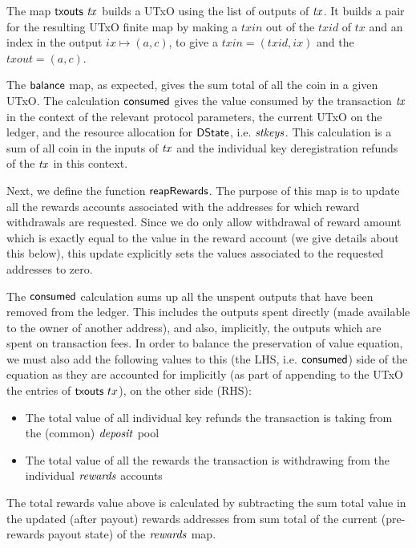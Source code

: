 \documentclass[11pt,a4paper,dvipsnames]{article}
\newcommand{\DState}{\type{DState}}
\theoremstyle{definition}
\theoremstyle{definition}
\begin{document}
The map $\mathsf{txouts}~ \mathit{tx}$ builds a UTxO using the
list of outputs of $\mathit{tx}$. It builds a pair for the resulting UTxO
finite map by making a $txin$ out of the $txid$ of $tx$ and an index in the output $ix \mapsto (a,c)$, to give a $txin = (txid, ix)$ and the
$txout=(a,c)$.

The $\mathsf{balance}$ map, as expected, gives the sum total of all the coin in
a given UTxO. The calculation $\mathsf{consumed}$ gives the value consumed
by the transaction $\mathit{tx}$ in the context of the relevant protocol
parameters, the current UTxO on the ledger, and the resource allocation for
$\DState$, i.e. $\mathit{stkeys}$. This calculation is a sum of all coin in the inputs of
$\mathit{tx}$  and the individual key
deregistration refunds of the $\mathit{tx}$ in this context.

Next, we define the function $\mathsf{reapRewards}$. The purpose of this map is
to update all the rewards accounts associated with the addresses for which
reward withdrawals are requested. Since we do only allow withdrawal of reward
amount which is exactly equal to the value in the reward account (we
give details about this below), this update explicitly sets the values
associated to the requested addresses to zero.

The $\mathsf{consumed}$ calculation sums up all the unspent outputs that
have been removed from the ledger. This includes the outputs spent directly
(made available to the owner of another address), and also, implicitly,
the outputs which are spent on transaction fees. In order to balance
the preservation of value equation, we must also add the following values
to this (the LHS, i.e. $\mathsf{consumed}$) side of the equation as they are
accounted for implicitly (as
part of appending to the UTxO the entries of $\mathsf{txouts}~{tx}$), on the
other side (RHS):

\begin{itemize}
\item The total value of all individual key refunds the transaction is taking from
the (common) $\mathit{deposit}$ pool
\item The total value of all the rewards the transaction is withdrawing from
the individual $\mathit{rewards}$ accounts
\end{itemize}

The total rewards value above is calculated by subtracting the sum total value in the
updated (after payout) rewards addresses from sum total of the current (pre-rewards
payout state) of the $\mathit{rewards}$ map.
\end{document}
